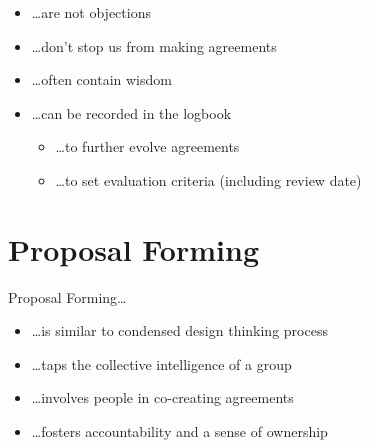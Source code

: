 \begin{itemize}
\item {\ldots}are not objections

\item {\ldots}don't stop us from making agreements

\item {\ldots}often contain wisdom

\item {\ldots}can be recorded in the logbook

\begin{itemize}
\item {\ldots}to further evolve agreements

\item {\ldots}to set evaluation criteria (including review date)

\end{itemize}

\end{itemize}

\section{Proposal Forming}
\label{proposalforming}

Proposal Forming{\ldots}

\begin{itemize}
\item {\ldots}is similar to condensed design thinking process

\item {\ldots}taps the collective intelligence of a group

\item {\ldots}involves people in co-creating agreements

\item {\ldots}fosters accountability and a sense of ownership

\end{itemize}

